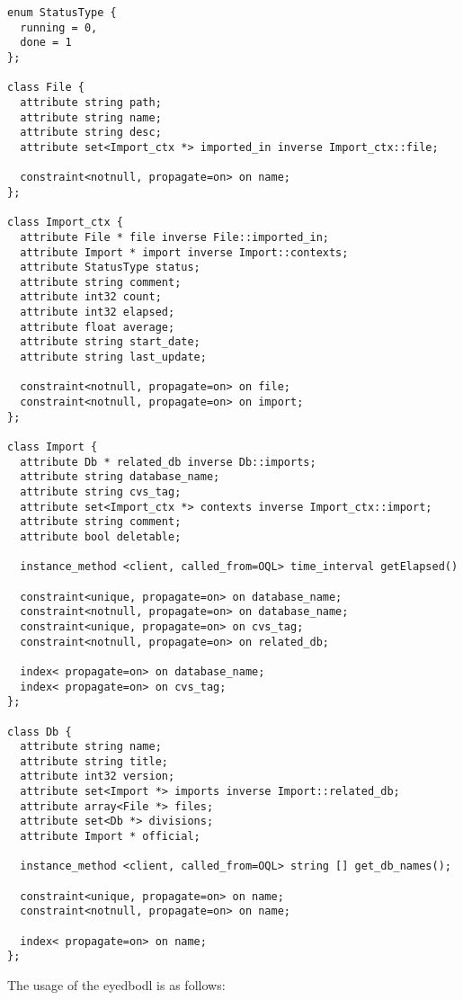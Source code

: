\begin{verbatim}
enum StatusType {
  running = 0,
  done = 1
};

class File {
  attribute string path;
  attribute string name;
  attribute string desc;
  attribute set<Import_ctx *> imported_in inverse Import_ctx::file;

  constraint<notnull, propagate=on> on name;
};

class Import_ctx {
  attribute File * file inverse File::imported_in;
  attribute Import * import inverse Import::contexts;
  attribute StatusType status;
  attribute string comment;
  attribute int32 count;
  attribute int32 elapsed;
  attribute float average;
  attribute string start_date;
  attribute string last_update;

  constraint<notnull, propagate=on> on file;
  constraint<notnull, propagate=on> on import;
};

class Import {
  attribute Db * related_db inverse Db::imports;
  attribute string database_name;
  attribute string cvs_tag;
  attribute set<Import_ctx *> contexts inverse Import_ctx::import;
  attribute string comment;
  attribute bool deletable;

  instance_method <client, called_from=OQL> time_interval getElapsed()

  constraint<unique, propagate=on> on database_name;
  constraint<notnull, propagate=on> on database_name;
  constraint<unique, propagate=on> on cvs_tag;
  constraint<notnull, propagate=on> on related_db;

  index< propagate=on> on database_name;
  index< propagate=on> on cvs_tag;
};

class Db {
  attribute string name;
  attribute string title;
  attribute int32 version;
  attribute set<Import *> imports inverse Import::related_db;
  attribute array<File *> files;
  attribute set<Db *> divisions;
  attribute Import * official;

  instance_method <client, called_from=OQL> string [] get_db_names();

  constraint<unique, propagate=on> on name;
  constraint<notnull, propagate=on> on name;

  index< propagate=on> on name;
};
\end{verbatim}
\newpage
{}
The usage of the eyedbodl is as follows:
